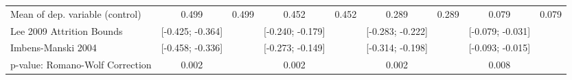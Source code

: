 {\begin{tabular}{l*{8}{c}}
Mean of dep. variable (control)                   &       0.499         &       0.499         &       0.452         &       0.452         &       0.289         &       0.289         &       0.079         &       0.079         \\
Lee 2009 Attrition Bounds                         &[-0.425; -0.364]         &                     &[-0.240; -0.179]         &                     &[-0.283; -0.222]         &                     &[-0.079; -0.031]         &                     \\
Imbens-Manski 2004                                &[-0.458; -0.336]         &                     &[-0.273; -0.149]         &                     &[-0.314; -0.198]         &                     &[-0.093; -0.015]         &                     \\
p-value: Romano-Wolf Correction                   &       0.002         &                     &       0.002         &                     &       0.002         &                     &       0.008         &                     \\
\hline\hline
\end{tabular}
}
